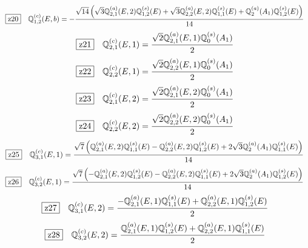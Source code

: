 \documentclass[fleqn,10pt,landscape]{jsarticle}
\begin{document}
\begin{dmath*}
\hspace*{3mm}\fbox{z20}\quad \mathbb{Q}_{1,2}^{(c)}(E,b)=- \frac{\sqrt{14} \left(\sqrt{3} \mathbb{Q}_{2,1}^{(a)}(E,2) \mathbb{Q}_{1,2}^{(s)}(E) + \sqrt{3} \mathbb{Q}_{2,2}^{(a)}(E,2) \mathbb{Q}_{1,1}^{(s)}(E) + \mathbb{Q}_{2}^{(a)}(A_{1}) \mathbb{Q}_{1,2}^{(s)}(E)\right)}{14}
\end{dmath*}
\begin{dmath*}
\hspace*{3mm}\fbox{z21}\quad \mathbb{Q}_{2,1}^{(c)}(E,1)=\frac{\sqrt{2} \mathbb{Q}_{2,1}^{(a)}(E,1) \mathbb{Q}_{0}^{(s)}(A_{1})}{2}
\end{dmath*}
\begin{dmath*}
\hspace*{3mm}\fbox{z22}\quad \mathbb{Q}_{2,2}^{(c)}(E,1)=\frac{\sqrt{2} \mathbb{Q}_{2,2}^{(a)}(E,1) \mathbb{Q}_{0}^{(s)}(A_{1})}{2}
\end{dmath*}
\begin{dmath*}
\hspace*{3mm}\fbox{z23}\quad \mathbb{Q}_{2,1}^{(c)}(E,2)=\frac{\sqrt{2} \mathbb{Q}_{2,1}^{(a)}(E,2) \mathbb{Q}_{0}^{(s)}(A_{1})}{2}
\end{dmath*}
\begin{dmath*}
\hspace*{3mm}\fbox{z24}\quad \mathbb{Q}_{2,2}^{(c)}(E,2)=\frac{\sqrt{2} \mathbb{Q}_{2,2}^{(a)}(E,2) \mathbb{Q}_{0}^{(s)}(A_{1})}{2}
\end{dmath*}
\begin{dmath*}
\hspace*{3mm}\fbox{z25}\quad \mathbb{Q}_{3,1}^{(c)}(E,1)=\frac{\sqrt{7} \left(\mathbb{Q}_{2,1}^{(a)}(E,2) \mathbb{Q}_{1,1}^{(s)}(E) - \mathbb{Q}_{2,2}^{(a)}(E,2) \mathbb{Q}_{1,2}^{(s)}(E) + 2 \sqrt{3} \mathbb{Q}_{2}^{(a)}(A_{1}) \mathbb{Q}_{1,1}^{(s)}(E)\right)}{14}
\end{dmath*}
\begin{dmath*}
\hspace*{3mm}\fbox{z26}\quad \mathbb{Q}_{3,2}^{(c)}(E,1)=\frac{\sqrt{7} \left(- \mathbb{Q}_{2,1}^{(a)}(E,2) \mathbb{Q}_{1,2}^{(s)}(E) - \mathbb{Q}_{2,2}^{(a)}(E,2) \mathbb{Q}_{1,1}^{(s)}(E) + 2 \sqrt{3} \mathbb{Q}_{2}^{(a)}(A_{1}) \mathbb{Q}_{1,2}^{(s)}(E)\right)}{14}
\end{dmath*}
\begin{dmath*}
\hspace*{3mm}\fbox{z27}\quad \mathbb{Q}_{3,1}^{(c)}(E,2)=\frac{- \mathbb{Q}_{2,1}^{(a)}(E,1) \mathbb{Q}_{1,1}^{(s)}(E) + \mathbb{Q}_{2,2}^{(a)}(E,1) \mathbb{Q}_{1,2}^{(s)}(E)}{2}
\end{dmath*}
\begin{dmath*}
\hspace*{3mm}\fbox{z28}\quad \mathbb{Q}_{3,2}^{(c)}(E,2)=\frac{\mathbb{Q}_{2,1}^{(a)}(E,1) \mathbb{Q}_{1,2}^{(s)}(E) + \mathbb{Q}_{2,2}^{(a)}(E,1) \mathbb{Q}_{1,1}^{(s)}(E)}{2}
\end{dmath*}
\vspace{5mm}
\end{document}

